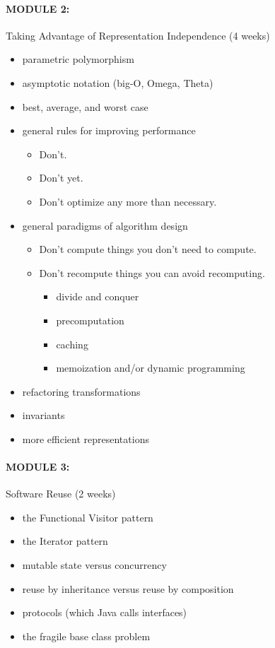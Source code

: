 \documentclass[11pt]{article}
\begin{document}
\paragraph{MODULE 2:}
%
Taking Advantage of Representation Independence (4 weeks)
%
\begin{itemize}
\item parametric polymorphism
\item asymptotic notation (big-O, Omega, Theta)
\item best, average, and worst case
\item general rules for improving performance
\begin{itemize}
\item Don't.
\item Don't yet.
\item Don't optimize any more than necessary.
\end{itemize}
\item general paradigms of algorithm design
\begin{itemize}
\item Don't compute things you don't need to compute.
\item Don't recompute things you can avoid recomputing.
\begin{itemize}
\item divide and conquer
\item precomputation
\item caching
\item memoization and/or dynamic programming
\end{itemize}
\end{itemize}
\item refactoring transformations
\item invariants
\item more efficient representations
\end{itemize}

\paragraph{MODULE 3:}
%
Software Reuse (2 weeks)
%
\begin{itemize}
\item the Functional Visitor pattern
\item the Iterator pattern
\item mutable state versus concurrency
\item reuse by inheritance versus reuse by composition
\item protocols (which Java calls interfaces)
\item the fragile base class problem
\end{itemize}
\end{document}

